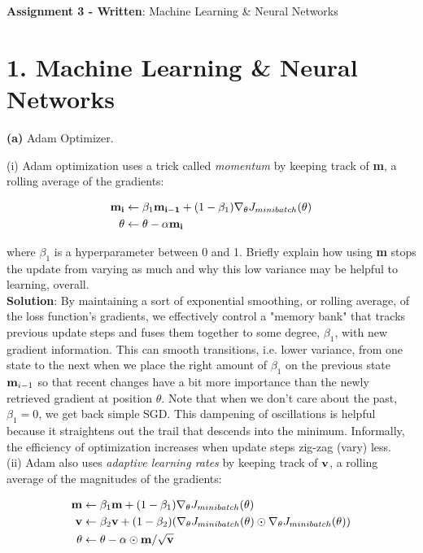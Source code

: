 \documentclass[10pt]{article}
\author{Jonathan Tow}
\date{\today}
\title{}
\begin{document}
\textbf{Assignment 3 - Written}: Machine Learning \& Neural Networks


\section*{1. Machine Learning \& Neural Networks}
\label{sec:org864511c}

\textbf{(a)} Adam Optimizer.

(i) Adam optimization uses a trick called \emph{momentum} by keeping track of \textbf{m}, a rolling average of the gradients:

\begin{LATEX}
\begin{align*}
\bold{m_{i}} &\leftarrow \beta_1 \bold{m_{i-1}} + (1-\beta_1) \nabla_{\theta} J_{minibatch}(\theta) \\
\theta &\leftarrow \theta - \alpha\bold{m_i}
\end{align*}
\end{LATEX}

where \(\beta_1\) is a hyperparameter between 0 and 1. Briefly explain how using \textbf{m} stops the update from varying 
as much and why this low variance may be helpful to learning, overall.\\


\textbf{Solution}: By maintaining a sort of exponential smoothing, or rolling average, of the loss function's gradients, we effectively control 
a "memory bank" that tracks previous update steps and fuses them together to some degree, \(\beta_1\), with new gradient information. This can
smooth transitions, i.e. lower variance, from one state to the next when we place the right amount of \(\beta_1\) on the previous state
\(\bold{m}_{i-1}\) so that recent changes have a bit more importance than the newly retrieved gradient at position \(\theta\). Note that when we don't
care about  the past, \(\beta_1 = 0\), we get back simple SGD.
This dampening of oscillations is helpful because it straightens out the trail that descends into the minimum. 
Informally, the efficiency of optimization increases when update steps zig-zag (vary) less.\\

(ii) Adam also uses \emph{adaptive learning rates} by keeping track of \(\bold{v}\), a rolling average of the magnitudes of the gradients:

\begin{LATEX}
\begin{align*}
\bold{m} &\leftarrow \beta_1 \bold{m} + (1-\beta_1) \nabla_{\theta} J_{minibatch}(\theta) \\
\bold{v} &\leftarrow \beta_2 \bold{v} + (1-\beta_2) (\nabla_{\theta} J_{minibatch}(\theta) \odot \nabla_{\theta} J_{minibatch}(\theta))\\
\theta &\leftarrow \theta - \alpha \odot \bold{m} / \sqrt{\bold{v}}
\end{align*}
\end{LATEX}
\end{document}
